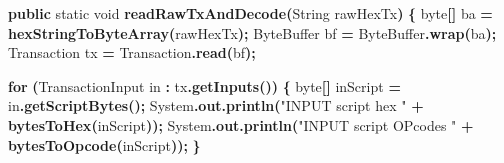 \documentclass[
  italian,
  openany]{book}
\newenvironment{Shaded}{\begin{snugshade}}{\end{snugshade}}
\newcommand{\BuiltInTok}[1]{#1}
\newcommand{\ControlFlowTok}[1]{\textcolor[rgb]{0.13,0.29,0.53}{\textbf{#1}}}
\newcommand{\DataTypeTok}[1]{\textcolor[rgb]{0.13,0.29,0.53}{#1}}
\newcommand{\FunctionTok}[1]{\textcolor[rgb]{0.13,0.29,0.53}{\textbf{#1}}}
\newcommand{\KeywordTok}[1]{\textcolor[rgb]{0.13,0.29,0.53}{\textbf{#1}}}
\newcommand{\NormalTok}[1]{#1}
\newcommand{\OperatorTok}[1]{\textcolor[rgb]{0.81,0.36,0.00}{\textbf{#1}}}
\newcommand{\StringTok}[1]{\textcolor[rgb]{0.31,0.60,0.02}{#1}}
\begin{document}
\begin{Shaded}
\begin{Highlighting}[]
\KeywordTok{public} \DataTypeTok{static} \DataTypeTok{void} \FunctionTok{readRawTxAndDecode}\OperatorTok{(}\BuiltInTok{String}\NormalTok{ rawHexTx}\OperatorTok{)} \OperatorTok{\{}
    \DataTypeTok{byte}\OperatorTok{[]}\NormalTok{ ba }\OperatorTok{=} \FunctionTok{hexStringToByteArray}\OperatorTok{(}\NormalTok{rawHexTx}\OperatorTok{);}
    \BuiltInTok{ByteBuffer}\NormalTok{ bf }\OperatorTok{=} \BuiltInTok{ByteBuffer}\OperatorTok{.}\FunctionTok{wrap}\OperatorTok{(}\NormalTok{ba}\OperatorTok{);}
\NormalTok{    Transaction tx }\OperatorTok{=}\NormalTok{ Transaction}\OperatorTok{.}\FunctionTok{read}\OperatorTok{(}\NormalTok{bf}\OperatorTok{);}

    \ControlFlowTok{for} \OperatorTok{(}\NormalTok{TransactionInput in }\OperatorTok{:}\NormalTok{ tx}\OperatorTok{.}\FunctionTok{getInputs}\OperatorTok{())} \OperatorTok{\{}
        \DataTypeTok{byte}\OperatorTok{[]}\NormalTok{ inScript }\OperatorTok{=}\NormalTok{ in}\OperatorTok{.}\FunctionTok{getScriptBytes}\OperatorTok{();}
        \BuiltInTok{System}\OperatorTok{.}\FunctionTok{out}\OperatorTok{.}\FunctionTok{println}\OperatorTok{(}\StringTok{"INPUT script hex "}     \OperatorTok{+} \FunctionTok{bytesToHex}\OperatorTok{(}\NormalTok{inScript}\OperatorTok{));}
        \BuiltInTok{System}\OperatorTok{.}\FunctionTok{out}\OperatorTok{.}\FunctionTok{println}\OperatorTok{(}\StringTok{"INPUT script OPcodes "} \OperatorTok{+} \FunctionTok{bytesToOpcode}\OperatorTok{(}\NormalTok{inScript}\OperatorTok{));}
    \OperatorTok{\}}


\end{Highlighting}
\end{Shaded}
\end{document}
